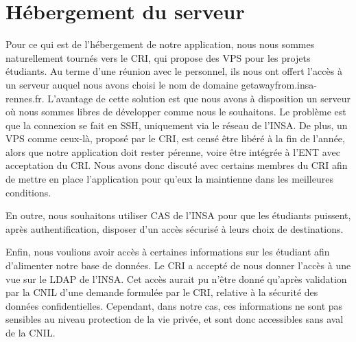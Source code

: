 \section{Hébergement du serveur}

Pour ce qui est de l'hébergement de notre application, nous nous sommes naturellement tournés vers le CRI, qui propose des VPS pour les projets étudiants. Au terme d'une réunion avec le personnel, ils nous ont offert l'accès à un serveur auquel nous avons choisi le nom de domaine getawayfrom.insa-rennes.fr. L'avantage de cette solution est que nous avons à disposition un serveur où nous sommes libres de développer comme nous le souhaitons. Le problème est que la connexion se fait en SSH, uniquement via le réseau de l'INSA. De plus, un VPS comme ceux-là, proposé par le CRI, est censé être libéré à la fin de l'année, alors que notre application doit rester pérenne, voire être intégrée à l'ENT avec acceptation du CRI. Nous avons donc discuté avec certains membres du CRI afin de mettre en place l'application pour qu'eux la maintienne dans les meilleures conditions.

En outre, nous souhaitons utiliser CAS de l'INSA pour que les étudiants puissent, après authentification, disposer d'un accès sécurisé à leurs choix de destinations.

Enfin, nous voulions avoir accès à certaines informations sur les étudiant afin d'alimenter notre base de données. Le CRI a accepté de nous donner l'accès à une vue sur le LDAP de l'INSA. Cet accès aurait pu n'être donné qu'après validation par la CNIL d'une demande formulée par le CRI, relative à la sécurité des données confidentielles. Cependant, dans notre cas, ces informations ne sont pas sensibles au niveau protection de la vie privée, et sont donc accessibles sans aval de la CNIL.